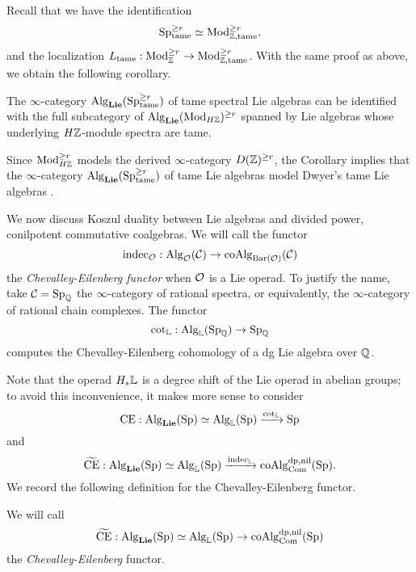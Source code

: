 Recall that we have the identification
$$
\operatorname{Sp}^{\geq r}_{\operatorname{\operatorname{tame}}} \simeq
\operatorname{Mod}_{{\mathbb{Z}},\operatorname{\operatorname{tame}}}^{\geq r},
$$
and the localization $L_{\operatorname{\operatorname{tame}}}:\operatorname{Mod}_{{\mathbb{Z}}}^{\geq r} \to \operatorname{Mod}_{{\mathbb{Z}},\operatorname{\operatorname{tame}}}^{\geq r}$. With the same proof as above, we obtain the following corollary.
\begin{corollary}
    The $\infty$-category $\operatorname{Alg}_{\mathbf{Lie}}(\operatorname{Sp}^{\geq r}_{\operatorname{\operatorname{tame}}})$ of tame spectral Lie algebras can be identified with the full subcategory of $\operatorname{Alg}_{\mathbf{Lie}}(\operatorname{Mod}_{H{\mathbb{Z}}})^{\geq r}$ spanned by Lie algebras whose underlying $H{\mathbb{Z}}$-module spectra are tame.
\end{corollary}

\begin{remark}
\label{Identify tame Lie algebra with Dwyer's Lie algebra}
Since $\operatorname{Mod}_{H{\mathbb{Z}}}^{\geq r}$ models the derived $\infty$-category $D({\mathbb{Z}})^{\geq r}$, the Corollary implies that the $\infty$-category $\operatorname{Alg}_{\mathbf{Lie}}(\operatorname{Sp}^{\geq r}_{\operatorname{\operatorname{tame}}})$ of tame Lie algebras model Dwyer's tame Lie algebras \cite{Dwyer}.
\end{remark}


We now discuss Koszul duality between Lie algebras and divided power, conilpotent commutative coalgebras.
We will call the functor
$$\operatorname{indec}_{{\mathcal{O}}}: \operatorname{Alg}_{{\mathcal{O}}}({\mathcal{C}})\to \operatorname{coAlg}_{\operatorname{Bar}({\mathcal{O}})}({\mathcal{C}})$$
the \emph{Chevalley-Eilenberg functor} when ${\mathcal{O}}$ is a Lie operad. 
To justify the name, take ${\mathcal{C}} = \operatorname{Sp}_{{\mathbb{Q}}}$ the $\infty$-category of rational spectra, or equivalently, the $\infty$-category of rational chain complexes.
The functor 
$$
\cot_{{\mathbb{L}}}: \operatorname{Alg}_{{\mathbb{L}}}(\operatorname{Sp}_{{\mathbb{Q}}}) 
\to 
\operatorname{Sp}_{{\mathbb{Q}}}
$$
computes the Chevalley-Eilenberg cohomology of a dg Lie algebra over ${\mathbb{Q}}$. 

Note that the operad $H_{*}{\mathbb{L}}$ is a degree shift of the Lie operad in abelian groups; to avoid this inconvenience, it makes more sense to consider
$$
\operatorname{CE}: \operatorname{Alg}_{\mathbf{Lie}}(\operatorname{Sp})\simeq \operatorname{Alg}_{{\mathbb{L}}}(\operatorname{Sp})
\xrightarrow{\cot_{{\mathbb{L}}}}
\operatorname{Sp}
$$
and 
$$
\widetilde{\operatorname{CE}}: \operatorname{Alg}_{\mathbf{Lie}}(\operatorname{Sp})\simeq \operatorname{Alg}_{{\mathbb{L}}}(\operatorname{Sp})
\xrightarrow{\operatorname{indec}_{{\mathbb{L}}}}
\operatorname{coAlg}^{\operatorname{dp}, \operatorname{nil}}_{\operatorname{Com}}(\operatorname{Sp}).
$$
We record the following definition for the Chevalley-Eilenberg functor.
\begin{definition}
\label{CChevalley-Eilenberg functor}
    We will call $$
    \widetilde{\operatorname{CE}}: \operatorname{Alg}_{\mathbf{Lie}}(\operatorname{Sp})\simeq \operatorname{Alg}_{{\mathbb{L}}}(\operatorname{Sp})
\to 
\operatorname{coAlg}^{\operatorname{dp}, \operatorname{nil}}_{\operatorname{Com}}(\operatorname{Sp})
$$ the \emph{Chevalley-Eilenberg} functor.
\end{definition}

